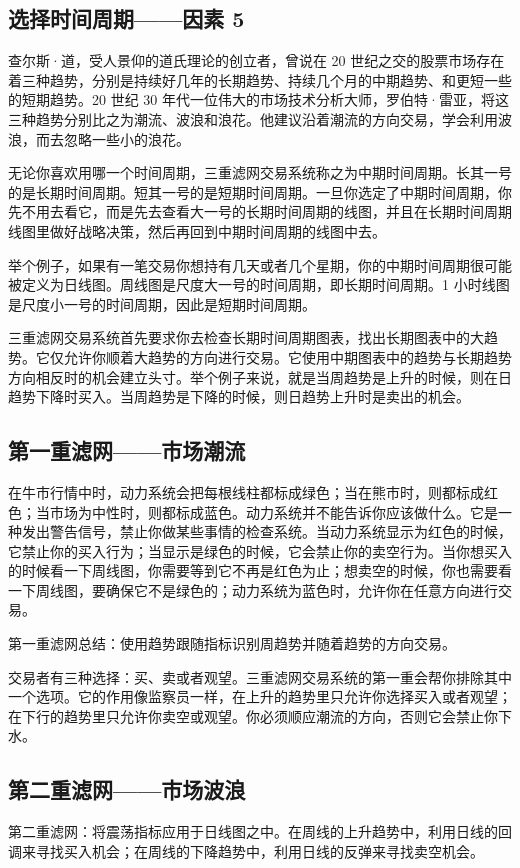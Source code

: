 \subsection*{选择时间周期——因素 5}
查尔斯·道，受人景仰的道氏理论的创立者，曾说在 20 世纪之交的股票市场存在着三种趋势，分别是持续好几年的长期趋势、持续几个月的中期趋势、和更短一些的短期趋势。20 世纪 30 年代一位伟大的市场技术分析大师，罗伯特·雷亚，将这三种趋势分别比之为潮流、波浪和浪花。他建议沿着潮流的方向交易，学会利用波浪，而去忽略一些小的浪花。

无论你喜欢用哪一个时间周期，三重滤网交易系统称之为中期时间周期。长其一号的是长期时间周期。短其一号的是短期时间周期。一旦你选定了中期时间周期，你先不用去看它，而是先去查看大一号的长期时间周期的线图，并且在长期时间周期线图里做好战略决策，然后再回到中期时间周期的线图中去。

举个例子，如果有一笔交易你想持有几天或者几个星期，你的中期时间周期很可能被定义为日线图。周线图是尺度大一号的时间周期，即长期时间周期。1 小时线图是尺度小一号的时间周期，因此是短期时间周期。

三重滤网交易系统首先要求你去检查长期时间周期图表，找出长期图表中的大趋势。它仅允许你顺着大趋势的方向进行交易。它使用中期图表中的趋势与长期趋势方向相反时的机会建立头寸。举个例子来说，就是当周趋势是上升的时候，则在日趋势下降时买入。当周趋势是下降的时候，则日趋势上升时是卖出的机会。
\subsection*{第一重滤网——市场潮流}
在牛市行情中时，动力系统会把每根线柱都标成绿色；当在熊市时，则都标成红色；当市场为中性时，则都标成蓝色。动力系统并不能告诉你应该做什么。它是一种发出警告信号，禁止你做某些事情的检查系统。当动力系统显示为红色的时候，它禁止你的买入行为；当显示是绿色的时候，它会禁止你的卖空行为。当你想买入的时候看一下周线图，你需要等到它不再是红色为止；想卖空的时候，你也需要看一下周线图，要确保它不是绿色的；动力系统为蓝色时，允许你在任意方向进行交易。

第一重滤网总结：使用趋势跟随指标识别周趋势并随着趋势的方向交易。

交易者有三种选择：买、卖或者观望。三重滤网交易系统的第一重会帮你排除其中一个选项。它的作用像监察员一样，在上升的趋势里只允许你选择买入或者观望；在下行的趋势里只允许你卖空或观望。你必须顺应潮流的方向，否则它会禁止你下水。
\subsection*{第二重滤网——市场波浪}
第二重滤网：将震荡指标应用于日线图之中。在周线的上升趋势中，利用日线的回调来寻找买入机会；在周线的下降趋势中，利用日线的反弹来寻找卖空机会。

